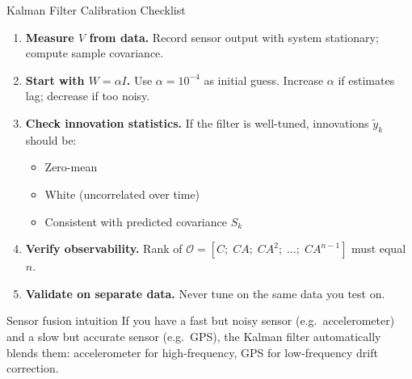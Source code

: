 \documentclass[aspectratio=169,11pt]{beamer}
\begin{document}
\begin{frame}[shrink=5]{Kalman Filter Calibration Checklist}

\begin{enumerate}
  \item \textbf{Measure $V$ from data.}
    Record sensor output with system stationary; compute sample covariance.

  \item \textbf{Start with $W = \alpha I$.}
    Use $\alpha = 10^{-4}$ as initial guess.  Increase $\alpha$ if estimates lag; decrease if too noisy.

  \item \textbf{Check innovation statistics.}
    If the filter is well-tuned, innovations $\tilde{y}_k$ should be:
    \begin{itemize}
      \item Zero-mean
      \item White (uncorrelated over time)
      \item Consistent with predicted covariance $S_k$
    \end{itemize}

  \item \textbf{Verify observability.}
    Rank of $\mathcal{O} = [C;\; CA;\; CA^2;\; \ldots;\; CA^{n-1}]$ must equal $n$.

  \item \textbf{Validate on separate data.}
    Never tune on the same data you test on.
\end{enumerate}

\begin{exampleblock}{Sensor fusion intuition}
If you have a fast but noisy sensor (e.g.\ accelerometer) and a slow but accurate sensor (e.g.\ GPS), the Kalman filter automatically blends them: accelerometer for high-frequency, GPS for low-frequency drift correction.
\end{exampleblock}
\end{frame}
\end{document}
